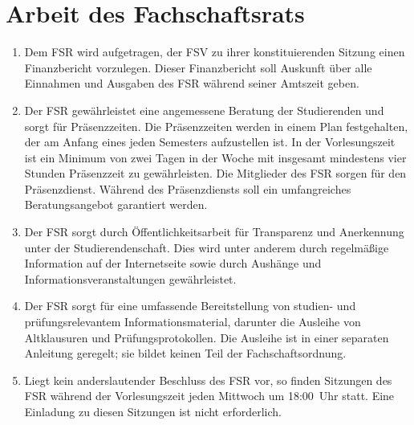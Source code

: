 \section{Arbeit des Fachschaftsrats}
\begin{enumerate}
	\item Dem FSR wird aufgetragen, der FSV zu ihrer konstituierenden Sitzung einen Finanzbericht vorzulegen.
	Dieser Finanzbericht soll Auskunft über alle Einnahmen und Ausgaben des FSR während seiner Amtszeit geben.
	\item Der FSR gewährleistet eine angemessene Beratung der Studierenden und sorgt für Präsenzzeiten.
	Die Präsenzzeiten werden in einem Plan festgehalten, der am Anfang eines jeden Semesters aufzustellen ist.
	In der Vorlesungszeit ist ein Minimum von zwei Tagen in der Woche mit insgesamt mindestens vier Stunden Präsenzzeit zu gewährleisten.
	Die Mitglieder des FSR sorgen für den Präsenzdienst.
	Während des Präsenzdiensts soll ein umfangreiches Beratungsangebot garantiert werden.
	\item Der FSR sorgt durch Öffentlichkeitsarbeit für Transparenz und Anerkennung unter der Studierendenschaft.
	Dies wird unter anderem durch regelmäßige Information auf der Internetseite sowie durch Aushänge und Informationsveranstaltungen gewährleistet.
	\item Der FSR sorgt für eine umfassende Bereitstellung von studien- und prüfungsrelevantem Informationsmaterial, darunter die Ausleihe von Altklausuren und Prüfungsprotokollen.
	Die Ausleihe ist in einer separaten Anleitung geregelt; sie bildet keinen Teil der Fachschaftsordnung.
	\item Liegt kein anderslautender Beschluss des FSR vor, so finden Sitzungen des FSR während der Vorlesungszeit jeden Mittwoch um 18:00~Uhr  statt.
	Eine Einladung zu diesen Sitzungen ist nicht erforderlich.
\end{enumerate}


